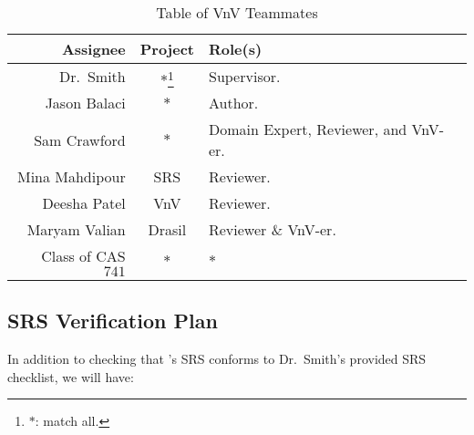 \documentclass[12pt, titlepage]{article}
\begin{document}
\begin{longtable}{|r|c|l|}
    \caption{Table of VnV Teammates}
    \label{table:vnv_teammates}

    \\ \hline
    \rowcolor{Maroon}
    \textbf{Assignee}    & \textbf{Project}                  & \textbf{Role(s)}                                              \\ \hline
    \rowcolor{White}
    Dr.\ Smith           & \(*\)\footnote{\(*\): match all.} & Supervisor.                                                   \\ \hline
    Jason Balaci         & \(*\)                             & Author.                                                       \\ \hline
    Sam Crawford         & \(*\)                             & Domain Expert, Reviewer, and VnV-er.                          \\ \hline
    Mina Mahdipour       & SRS                               & Reviewer.                                                     \\ \hline
    Deesha Patel         & VnV                               & Reviewer.                                                     \\ \hline
    Maryam Valian        & Drasil                            & Reviewer \& VnV-er.                                           \\ \hline
    Class of CAS \(741\) & \(*\)                             & \(*\)                                                         \\ \hline
\end{longtable}

\subsection{SRS Verification Plan}
\label{srs-verification-plan}

In addition to checking that \progname{}'s SRS conforms to Dr.\ Smith's provided
SRS checklist, we will have:
\end{document}
